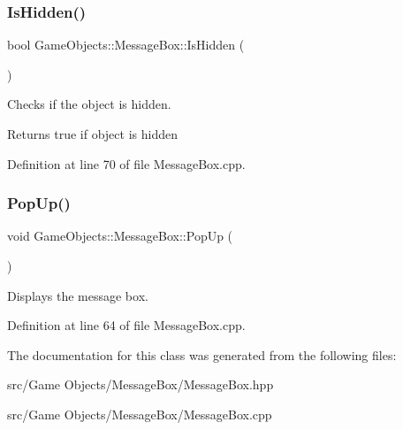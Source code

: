 \subsubsection{\texorpdfstring{IsHidden()}{IsHidden()}}
{\footnotesize\ttfamily bool Game\+Objects\+::\+Message\+Box\+::\+Is\+Hidden (\begin{DoxyParamCaption}{ }\end{DoxyParamCaption})}



Checks if the object is hidden. 

\begin{DoxyReturn}{Returns}
true if object is hidden \begin{DoxyVerb}\end{DoxyVerb}
 
\end{DoxyReturn}


Definition at line 70 of file Message\+Box.\+cpp.


\begin{DoxyCode}{0}

\end{DoxyCode}
\mbox{\label{class_game_objects_1_1_message_box_a7433a3b35f9d64d274c2fbc8c0d6b379}} 
\subsubsection{\texorpdfstring{PopUp()}{PopUp()}}
{\footnotesize\ttfamily void Game\+Objects\+::\+Message\+Box\+::\+Pop\+Up (\begin{DoxyParamCaption}{ }\end{DoxyParamCaption})}



Displays the message box. 

\begin{DoxyVerb}\end{DoxyVerb}
 

Definition at line 64 of file Message\+Box.\+cpp.


\begin{DoxyCode}{0}

\end{DoxyCode}


The documentation for this class was generated from the following files\+:\begin{DoxyCompactItemize}
\item 
src/\+Game Objects/\+Message\+Box/Message\+Box.\+hpp\item 
src/\+Game Objects/\+Message\+Box/Message\+Box.\+cpp\end{DoxyCompactItemize}

